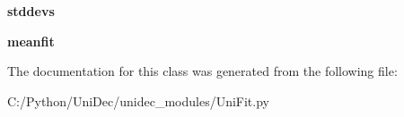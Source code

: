 \begin{DoxyCompactItemize}
\item 
\hypertarget{class_uni_dec_1_1unidec__modules_1_1_uni_fit_1_1_k_dmodel_adff52bfd1d01507e2377ae16219d19db}{}{\bfseries stddevs}\label{class_uni_dec_1_1unidec__modules_1_1_uni_fit_1_1_k_dmodel_adff52bfd1d01507e2377ae16219d19db}

\item 
\hypertarget{class_uni_dec_1_1unidec__modules_1_1_uni_fit_1_1_k_dmodel_a685571a70a2873bedb2caab9bdc1c203}{}{\bfseries meanfit}\label{class_uni_dec_1_1unidec__modules_1_1_uni_fit_1_1_k_dmodel_a685571a70a2873bedb2caab9bdc1c203}

\end{DoxyCompactItemize}


The documentation for this class was generated from the following file\+:\begin{DoxyCompactItemize}
\item 
C\+:/\+Python/\+Uni\+Dec/unidec\+\_\+modules/Uni\+Fit.\+py\end{DoxyCompactItemize}
